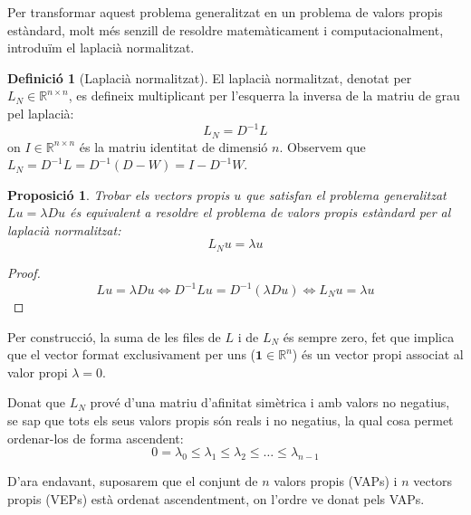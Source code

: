 \documentclass[12,twoside]{TFG-GM}
\newtheorem{proposition}[theorem]{Proposició}
\theoremstyle{definition}
\newtheorem{definition}[theorem]{Definició}
\theoremstyle{remark}
\newcommand{\R}{\mathbb{R}}
\begin{document}
Per transformar aquest problema generalitzat en un problema de valors propis estàndard, molt més senzill de resoldre matemàticament i computacionalment, introduïm el laplacià normalitzat.

\begin{definition}[Laplacià normalitzat]
    El laplacià normalitzat, denotat per $L_{N} \in \R^{n \times n}$, es defineix multiplicant per l'esquerra la inversa de la matriu de grau pel laplacià:
    \begin{equation}
        L_{N} = D^{-1}L
    \end{equation}
    on $I \in \R^{n \times n}$ és la matriu identitat de dimensió $n$. Observem que $L_{N} = D^{-1}L = D^{-1}(D-W) = I - D^{-1}W$.
\end{definition}

\begin{proposition}
    Trobar els vectors propis $u$ que satisfan el problema generalitzat $L u = \lambda D u$ és equivalent a resoldre el problema de valors propis estàndard per al laplacià normalitzat:
    \begin{equation}\label{eq:valors_propis_normalitzat}
        L_{N} u = \lambda u
    \end{equation}
\end{proposition}

\begin{proof}
    \begin{equation*}
        Lu = \lambda Du \iff D^{-1}Lu = D^{-1} (\lambda Du) \iff L_{N} u = \lambda u
    \end{equation*}
\end{proof}

Per construcció, la suma de les files de $L$ i de $L_{N}$ és sempre zero, fet que implica que el vector format exclusivament per uns ($\mathbf{1} \in \R^n$) és un vector propi associat al valor propi $\lambda = 0$. 

Donat que $L_{N}$ prové d'una matriu d'afinitat simètrica i amb valors no negatius, se sap que tots els seus valors propis són reals i no negatius, la qual cosa permet ordenar-los de forma ascendent:
\begin{equation}
    0 = \lambda_0 \leq \lambda_1 \leq \lambda_2 \leq \dots \leq \lambda_{n-1}
\end{equation}

D'ara endavant, suposarem que el conjunt de $n$ valors propis (VAPs) i $n$ vectors propis (VEPs) està ordenat ascendentment, on l'ordre ve donat pels VAPs.
\end{document}
